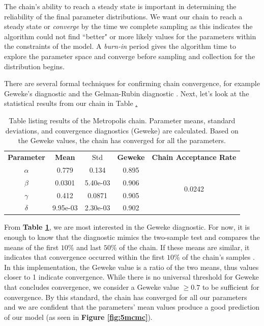 \documentclass{article}
\begin{document}
 \par The chain's ability to reach a steady state is important in determining the reliability of the final parameter distributions. We want our chain to reach a steady state or \emph{converge} by the time we complete sampling as this indicates the algorithm could not find ``better" or more likely values for the parameters within the constraints of the model. A \textit{burn-in} period gives the algorithm time to explore the parameter space and converge before sampling and collection for the distribution begins.
\par There are several formal techniques for confirming chain convergence, for example Geweke's diagnostic \cite{geweke1} and the Gelman-Rubin diagnostic \cite{gelman_rubin}. Next, let's look at the statistical results from our chain in Table \href{tab:1mcmc}.
\begin{table}[H]
\centering
        \begin{tabular}{c|c c c |c}
            \hline
            \textbf{Parameter} & \textbf{Mean} & Std &  \textbf{Geweke} & \textbf{Chain Acceptance Rate}\\ 
            \cline{1-5}
            $\alpha$ & 0.779 & 0.134 & 0.895 & \multirow{4}{*}{0.0242} \\
            $\beta$ & 0.0301 & 5.40e-03 & 0.906\\
            $\gamma$ & 0.412 & 0.0871  & 0.905\\
            $\delta$ &  9.95e-03 & 2.30e-03  & 0.902 
            \\\hline
                          \hline
        \end{tabular}
    \caption{Table listing results of the Metropolis chain. Parameter means, standard deviations, and convergence diagnostics (Geweke) are calculated. Based on the Geweke values, the chain has converged for all the parameters.}
    \label{tab:1mcmc}
\end{table}
From \textbf{Table \ref{tab:1mcmc}}, we are most interested in the Geweke diagnostic. For now, it is enough to know that the diagnostic mimics the two-sample test  and compares the means of the first $10\%$ and last $50\%$ of the chain. If these means are similar, it indicates that convergence occurred within the first $10\%$ of the chain's samples \cite{geweke_ppt} \cite{geweke1}. In this implementation, the Geweke value is a ratio of the two means, thus values closer to 1 indicate convergence. While there is no universal threshold for Geweke that concludes convergence, we consider a Geweke value $\geq 0.7$ to be sufficient for convergence. By this standard, the chain has converged for all our parameters and we are confident that the parameters' mean values produce a good prediction of our model (as seen in \textbf{Figure \ref{fig:5mcmc}}). 
\end{document}
